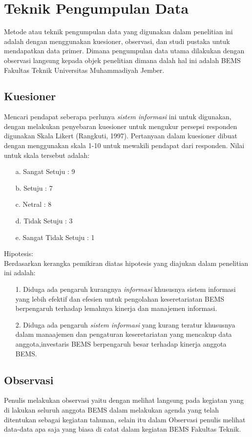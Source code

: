 \documentclass{jtetiproposalskripsi}
\begin{document}
\section{Teknik Pengumpulan Data}

Metode atau teknik pengumpulan data yang digunakan dalam penelitian ini adalah dengan menggunakan kuesioner, observasi, dan studi pustaka untuk mendapatkan data primer.
Dimana pengumpulan data utama dilakukan dengan observasi langsung kepada objek penelitian dimana dalah hal ini adalah BEMS Fakultas Teknik Universitas Muhammadiyah  Jember.
\subsection{Kuesioner}

Mencari pendapat seberapa perlunya \emph{sistem informasi} ini untuk digunakan, dengan melakukan penyebaran kuesioner untuk mengukur persepsi responden digunakan Skala Likert (Rangkuti, 1997). Pertanyaan dalam kuesioner dibuat dengan menggunakan skala 1-10 untuk mewakili pendapat dari responden. Nilai untuk skala tersebut adalah:
\begin{itemize}
\item[a.] Sangat Setuju 		: 9
\item[b.] Setuju 				: 7
\item[c.] Netral				: 8
\item[d.] Tidak Setuju			: 3
\item[e.] Sangat Tidak Setuju	: 1
\end{itemize}
Hipotesis:\\
Berdasarkan  kerangka pemikiran diatas hipotesis yang diajukan dalam penelitian ini adalah:
\begin{itemize}
\item[1.] Diduga ada pengaruh kurangnya \emph{informasi} khususnya sistem informasi yang lebih efektif dan efesien untuk pengolahan keseretariatan BEMS berpengaruh terhadap lemahnya kinerja dan manajemen informasi.
\item[2.] Diduga ada pengaruh \emph{sistem informasi} yang kurang teratur khususnya dalam manaajemen dan pengaturan keseretariatan yang mencakup data anggota,investaris BEMS berpengaruh besar terhadap kinerja anggota BEMS.
\end{itemize}
\subsection{Observasi}
Penulis melakukan observasi yaitu dengan melihat langsung pada kegiatan yang di lakukan seluruh anggota BEMS dalam melakukan agenda yang telah ditentukan sebagai kegiatan tahunan, selain itu dalam Observasi penulis melihat data-data apa saja yang biasa di catat dalam kegiatan BEMS Fakultas Teknik.
\end{document}

